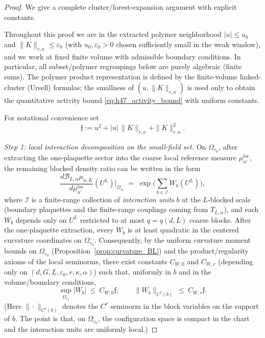 \begin{proof}
We give a complete cluster/forest-expansion argument with explicit constants.

Throughout this proof we are in the extracted polymer neighborhood
$|u|\le u_0$ and $\|K\|_{r,\kappa}\le\varepsilon_0$ (with $u_0,\varepsilon_0>0$ chosen sufficiently small in the weak window),
and we work at fixed finite volume with admissible boundary conditions.
In particular, all subset/polymer regroupings below are purely algebraic (finite sums).
The polymer product representation is defined by the finite-volume linked-cluster (Ursell) formulas;
the smallness of $(u,\|K\|_{r,\kappa})$ is used only to obtain the quantitative activity bound
\eqref{eq:h47_activity_bound} with uniform constants.


For notational convenience set
\[
\mathfrak f := u^2 + |u|\,\|K\|_{r,\kappa}+\|K\|_{r,\kappa}^2.
\]

\emph{Step 1: local interaction decomposition on the small-field set.}
On $\Omega_{\varepsilon_0}$, after extracting the one-plaquette sector into the coarse local reference measure
$\mu^{\mathrm{loc}}_{u'}$, the remaining blocked density ratio can be written in the form
\begin{equation}\label{eq:h47_exp_sumW}
\frac{d\mathcal B_{L,\alpha}\mu_{u,K}}{d\mu^{\mathrm{loc}}_{u'}}(U^L)\Bigg|_{\Omega_{\varepsilon_0}}
\;=\;\exp\Big(\sum_{b\in\mathscr I} W_b(U^L)\Big),
\end{equation}
where $\mathscr I$ is a finite-range collection of \emph{interaction units} $b$ at the $L$-blocked scale
(boundary plaquettes and the finite-range couplings coming from $T_{L,\alpha}$), and each $W_b$ depends only on
$U^L$ restricted to at most $q=q(d,L)$ coarse blocks.
After the one-plaquette extraction, every $W_b$ is at least quadratic in the centered curvature coordinates on
$\Omega_{\varepsilon_0}$. Consequently, by the uniform curvature moment bounds on $\Omega_{\varepsilon_0}$
(Proposition~\ref{prop:curvature_BL}) and the product/regularity axioms of the local seminorms, there exist
constants $C_{W,0}$ and $C_{W,r}$ (depending only on $(d,G,L,\varepsilon_0,r,\kappa,\alpha)$) such that, uniformly in
$b$ and in the volume/boundary conditions,
\begin{equation}\label{eq:h47_W_bounds}
\sup_{\Omega_{\varepsilon_0}} |W_b|\ \le\ C_{W,0}\mathfrak f,
\qquad
\|W_b\|_{C^r(b)}\ \le\ C_{W,r}\mathfrak f.
\end{equation}
(Here $\|\cdot\|_{C^r(b)}$ denotes the $C^r$ seminorm in the block variables on the support of $b$.
The point is that, on $\Omega_{\varepsilon_0}$, the configuration space is compact in the chart and the interaction
units are uniformly local.)


\end{proof}
